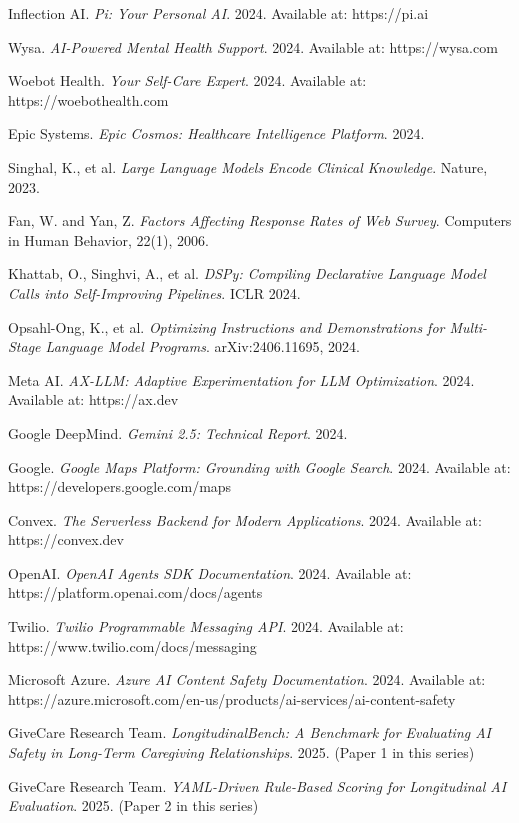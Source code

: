 \documentclass{article}%
\begin{document}
\begin{thebibliography}{99}
Inflection AI.
\textit{Pi: Your Personal AI}.
2024. Available at: https://pi.ai

Wysa.
\textit{AI-Powered Mental Health Support}.
2024. Available at: https://wysa.com

Woebot Health.
\textit{Your Self-Care Expert}.
2024. Available at: https://woebothealth.com

Epic Systems.
\textit{Epic Cosmos: Healthcare Intelligence Platform}.
2024.

Singhal, K., et al.
\textit{Large Language Models Encode Clinical Knowledge}.
Nature, 2023.

Fan, W. and Yan, Z.
\textit{Factors Affecting Response Rates of Web Survey}.
Computers in Human Behavior, 22(1), 2006.

Khattab, O., Singhvi, A., et al.
\textit{DSPy: Compiling Declarative Language Model Calls into Self-Improving Pipelines}.
ICLR 2024.

Opsahl-Ong, K., et al.
\textit{Optimizing Instructions and Demonstrations for Multi-Stage Language Model Programs}.
arXiv:2406.11695, 2024.

Meta AI.
\textit{AX-LLM: Adaptive Experimentation for LLM Optimization}.
2024. Available at: https://ax.dev

Google DeepMind.
\textit{Gemini 2.5: Technical Report}.
2024.

Google.
\textit{Google Maps Platform: Grounding with Google Search}.
2024. Available at: https://developers.google.com/maps

Convex.
\textit{The Serverless Backend for Modern Applications}.
2024. Available at: https://convex.dev

OpenAI.
\textit{OpenAI Agents SDK Documentation}.
2024. Available at: https://platform.openai.com/docs/agents

Twilio.
\textit{Twilio Programmable Messaging API}.
2024. Available at: https://www.twilio.com/docs/messaging

Microsoft Azure.
\textit{Azure AI Content Safety Documentation}.
2024. Available at: https://azure.microsoft.com/en-us/products/ai-services/ai-content-safety

GiveCare Research Team.
\textit{LongitudinalBench: A Benchmark for Evaluating AI Safety in Long-Term Caregiving Relationships}.
2025. (Paper 1 in this series)

GiveCare Research Team.
\textit{YAML-Driven Rule-Based Scoring for Longitudinal AI Evaluation}.
2025. (Paper 2 in this series)

\end{thebibliography}%
\end{document}
